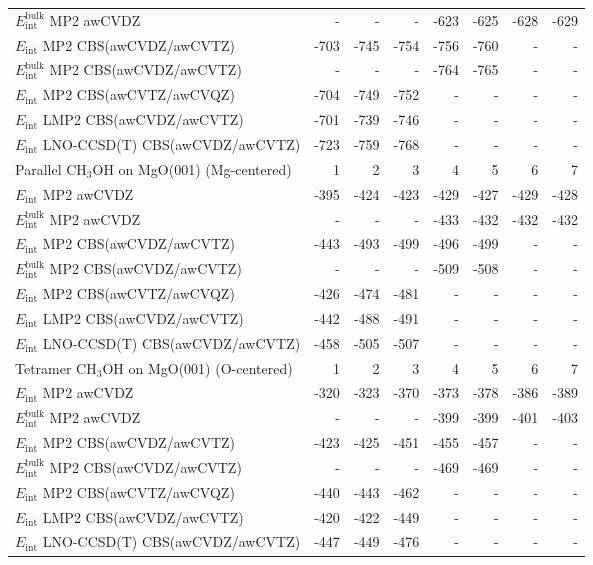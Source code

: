 \begin{longtable}{lrrrrrrr}
$E_\text{int}^\text{bulk}$ MP2 awCVDZ & - & - & - & -623 & -625 & -628 & -629 \\
$E_\text{int}$ MP2 CBS(awCVDZ/awCVTZ) & -703 & -745 & -754 & -756 & -760 & - & - \\
$E_\text{int}^\text{bulk}$ MP2 CBS(awCVDZ/awCVTZ) & - & - & - & -764 & -765 & - & - \\
$E_\text{int}$ MP2 CBS(awCVTZ/awCVQZ) & -704 & -749 & -752 & - & - & - & - \\
$E_\text{int}$ LMP2 CBS(awCVDZ/awCVTZ) & -701 & -739 & -746 & - & - & - & - \\
$E_\text{int}$ LNO-CCSD(T) CBS(awCVDZ/awCVTZ) & -723 & -759 & -768 & - & - & - & - \\
\toprule
Parallel CH$_3$OH on MgO(001) (Mg-centered) & 1 & 2 & 3 & 4 & 5 & 6 & 7 \\ 
\midrule
$E_\text{int}$ MP2 awCVDZ & -395 & -424 & -423 & -429 & -427 & -429 & -428 \\
$E_\text{int}^\text{bulk}$ MP2 awCVDZ & - & - & - & -433 & -432 & -432 & -432 \\
$E_\text{int}$ MP2 CBS(awCVDZ/awCVTZ) & -443 & -493 & -499 & -496 & -499 & - & - \\
$E_\text{int}^\text{bulk}$ MP2 CBS(awCVDZ/awCVTZ) & - & - & - & -509 & -508 & - & - \\
$E_\text{int}$ MP2 CBS(awCVTZ/awCVQZ) & -426 & -474 & -481 & - & - & - & - \\
$E_\text{int}$ LMP2 CBS(awCVDZ/awCVTZ) & -442 & -488 & -491 & - & - & - & - \\
$E_\text{int}$ LNO-CCSD(T) CBS(awCVDZ/awCVTZ) & -458 & -505 & -507 & - & - & - & - \\
\toprule
Tetramer CH$_3$OH on MgO(001) (O-centered) & 1 & 2 & 3 & 4 & 5 & 6 & 7 \\ 
\midrule
$E_\text{int}$ MP2 awCVDZ & -320 & -323 & -370 & -373 & -378 & -386 & -389 \\
$E_\text{int}^\text{bulk}$ MP2 awCVDZ & - & - & - & -399 & -399 & -401 & -403 \\
$E_\text{int}$ MP2 CBS(awCVDZ/awCVTZ) & -423 & -425 & -451 & -455 & -457 & - & - \\
$E_\text{int}^\text{bulk}$ MP2 CBS(awCVDZ/awCVTZ) & - & - & - & -469 & -469 & - & - \\
$E_\text{int}$ MP2 CBS(awCVTZ/awCVQZ) & -440 & -443 & -462 & - & - & - & - \\
$E_\text{int}$ LMP2 CBS(awCVDZ/awCVTZ) & -420 & -422 & -449 & - & - & - & - \\
$E_\text{int}$ LNO-CCSD(T) CBS(awCVDZ/awCVTZ) & -447 & -449 & -476 & - & - & - & - \\

\end{longtable}

